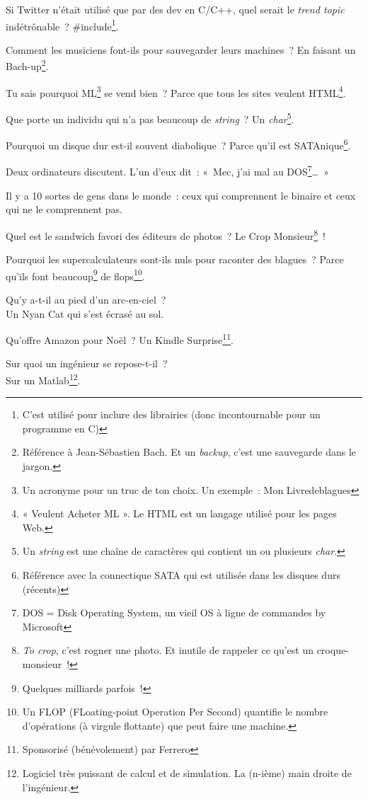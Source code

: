\documentclass[10pt,a5paper,fullpage]{book}
\begin{document}
\begin{enumerate}
{		\item Si Twitter n'était utilisé que par des dev en C/C++, quel serait le \textit{trend topic} indétrônable~? \#include\footnote{C'est utilisé pour inclure des librairies (donc incontournable pour un programme en C)}.	
		\item Comment les musiciens font-ils pour sauvegarder leurs machines~? En faisant un Bach-up\footnote{Référence à Jean-Sébastien Bach. Et un \textit{backup}, c'est une sauvegarde dans le jargon.}.
		\item Tu sais pourquoi ML\footnote{Un acronyme pour un truc de ton choix. Un exemple~: Mon Livredeblagues} se vend bien~? Parce que tous les sites veulent HTML\footnote{« Veulent Acheter ML ». Le HTML est un langage utilisé pour les pages Web.}.
		\item Que porte un individu qui n’a pas beaucoup de \textit{string}~? Un \textit{char}\footnote{Un \textit{string} est une chaîne de caractères qui contient un ou plusieurs \textit{char}.}.
		\item Pourquoi un disque dur est-il souvent diabolique~? Parce qu’il est SATAnique\footnote{Référence avec la connectique SATA qui est utilisée dans les disques durs (récents)}.
		\item Deux ordinateurs discutent. L’un d’eux dit~: « Mec, j’ai mal au DOS\footnote{DOS = Disk Operating System, un vieil OS à ligne de commandes by Microsoft}\ldots »
		\item Il y a 10 sortes de gens dans le monde~: ceux qui comprennent le binaire et ceux qui ne le comprennent pas.
		\item Quel est le sandwich favori des éditeurs de photos~? Le Crop Monsieur\footnote{\textit{To crop}, c'est rogner une photo. Et inutile de rappeler ce qu'est un croque-monsieur~!}~!
		\item Pourquoi les supercalculateurs sont-ils nuls pour raconter des blagues~? Parce qu’ils font beaucoup\footnote{Quelques milliards parfois~!} de flops\footnote{Un FLOP (FLoating-point Operation Per Second) quantifie le nombre d’opérations (à virgule flottante) que peut faire une machine.}. 
		\item Qu’y a-t-il au pied d’un arc-en-ciel~? \\Un Nyan Cat qui s’est écrasé au sol.
		\item Qu'offre Amazon pour Noël~? Un Kindle Surprise\footnote{Sponsorisé (bénévolement) par Ferrero\textregistered}.
		\item Sur quoi un ingénieur se repose-t-il~? \\Sur un Matlab\footnote{Logiciel très puissant de calcul et de simulation. La (n-ième) main droite de l’ingénieur.}.
}
\end{enumerate}
\end{document}
